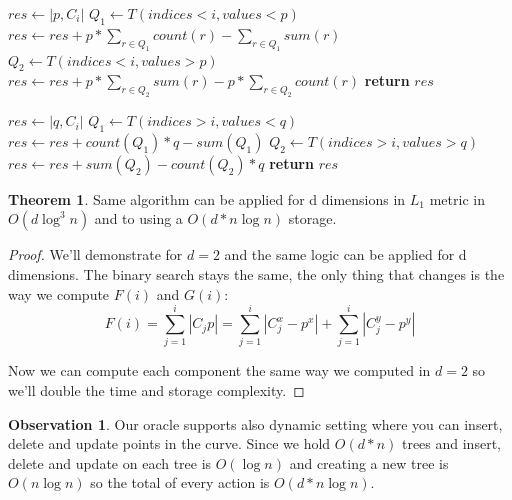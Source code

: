 \documentclass{article}
\theoremstyle{remark}
\theoremstyle{definition}
\newtheorem{observation}{Observation}[section]
\newtheorem{theorem}{Theorem}
\begin{document}
\begin{algorithmic}
  	\State $res\gets |p, C_i|$
  	\State $Q_1\gets T(indices<i, values<p)$
  	\State $res\gets res +  p*\displaystyle\sum_{r\in Q_1}{count(r)} - \displaystyle\sum_{r\in Q_1}{sum(r)}$
  	\State $Q_2\gets T(indices<i, values>p)$
 	\State $res\gets res + p*\displaystyle\sum_{r\in Q_2}{sum(r)}  - p*\displaystyle\sum_{r\in Q_2}{count(r)}$
 	\State \textbf{return} $res$
  \EndProcedure
\end{algorithmic}
\begin{algorithmic}
	\State $res\gets |q, C_i|$
	\State $Q_1\gets T(indices>i, values<q)$
	\State $res\gets res + count(Q_1)*q - sum(Q_1)$
	\State $Q_2\gets T(indices>i, values>q)$
	\State $res\gets res + sum(Q_2) - count(Q_2)*q$
	\State \textbf{return} $res$
	\EndProcedure
\end{algorithmic}
\begin{theorem}
	Same algorithm can be applied for d dimensions in $L_1$ metric in $O(d\log ^3n)$ and to using a $O(d*n\log n)$ storage.
\end{theorem}
\begin{proof}
	We'll demonstrate for $d=2$ and the same logic can be applied for d dimensions.
	The binary search stays the same, the only thing that changes is the way we compute $F(i)$ and $G(i)$:
$$F(i)=\displaystyle\sum_{j=1}^{i}|C_j p| = \displaystyle\sum_{j=1}^{i}|C^x_j - p^x| + \displaystyle\sum_{j=1}^{i}|C^y_j - p^y|$$
	 
	 Now we can compute each component the same way we computed in $d=2$ so we'll double the time and storage complexity.
\end{proof}
\begin{observation}
	Our oracle supports also dynamic setting where you can insert, delete and update points in the curve.
	Since we hold $O(d*n)$ trees and insert, delete and update on each tree is $O(\log n)$ and creating a new tree is $O(n\log n)$ so the total of every action is $O(d*n\log n)$.
\end{observation}
\end{document}
